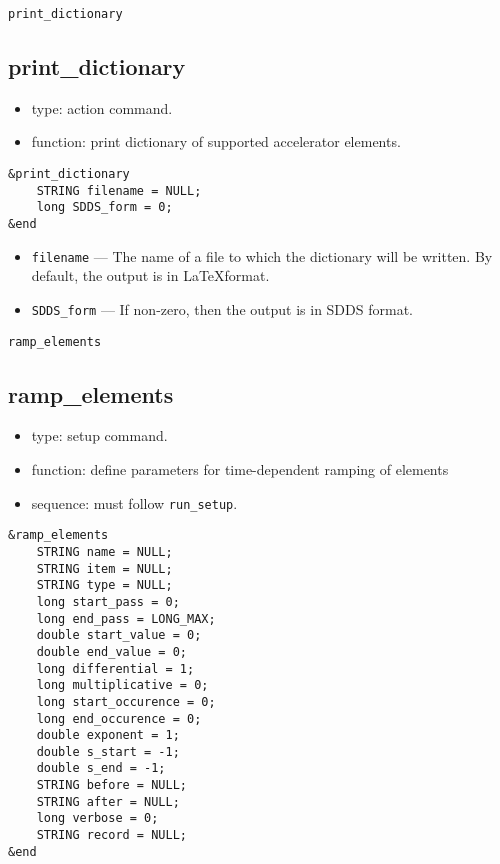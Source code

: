 \documentclass[11pt]{article}
\begin{document}
\newpage
\begin{center}{\Large\verb|print_dictionary|}\end{center}
\subsection{print\_dictionary \label{subsec:printdictionary}}

\begin{itemize}
\item type: action command.
\item function: print dictionary of supported accelerator elements.
\end{itemize}

\begin{verbatim}
&print_dictionary
    STRING filename = NULL;
    long SDDS_form = 0;
&end
\end{verbatim}

\begin{itemize}
\item \verb|filename| --- The name of a file to which the dictionary will be written.  By default, the 
  output is in \LaTeX format.
\item \verb|SDDS_form| --- If non-zero, then the output is in  SDDS format.
\end{itemize}

\newpage
\begin{center}{\Large\verb|ramp_elements|}\end{center}
\subsection{ramp\_elements\label{subsec:rampelements}}

\begin{itemize}
\item type: setup command.
\item function: define parameters for time-dependent ramping of elements
\item sequence: must follow \verb|run_setup|.
\end{itemize}

\begin{verbatim}
&ramp_elements
    STRING name = NULL;
    STRING item = NULL;
    STRING type = NULL;
    long start_pass = 0;
    long end_pass = LONG_MAX;
    double start_value = 0;
    double end_value = 0;
    long differential = 1;
    long multiplicative = 0;
    long start_occurence = 0;
    long end_occurence = 0;
    double exponent = 1;
    double s_start = -1;
    double s_end = -1;
    STRING before = NULL;
    STRING after = NULL;
    long verbose = 0;
    STRING record = NULL;
&end
\end{verbatim}
\end{document}

